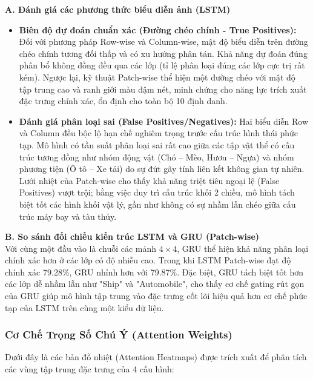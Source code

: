 \documentclass[12pt,a4paper]{article}
\numberwithin{figure}{section}
\numberwithin{table}{section}
\begin{document}
\textbf{A. Đánh giá các phương thức biểu diễn ảnh (LSTM)} \\
\begin{itemize}
    \item \textbf{Biên độ dự đoán chuẩn xác (Đường chéo chính - True Positives):} Đối với phương pháp Row-wise và Column-wise, mật độ biểu diễn trên đường chéo chính tương đối thấp và có xu hướng phân tán. Khả năng dự đoán đúng phân bổ không đồng đều qua các lớp (tỉ lệ phân loại đúng các lớp cực trị rất kém). Ngược lại, kỹ thuật Patch-wise thể hiện một đường chéo với mật độ tập trung cao và ranh giới màu đậm nét, minh chứng cho năng lực trích xuất đặc trưng chính xác, ổn định cho toàn bộ 10 định danh.
    \item \textbf{Đánh giá phân loại sai (False Positives/Negatives):} Hai biểu diễn Row và Column đều bộc lộ hạn chế nghiêm trọng trước cấu trúc hình thái phức tạp. Mô hình có tần suất phân loại sai rất cao giữa các tập vật thể có cấu trúc tương đồng như nhóm động vật (Chó -- Mèo, Hươu -- Ngựa) và nhóm phương tiện (Ô tô -- Xe tải) do sự đứt gãy tính liên kết không gian tự nhiên. Lưới nhiệt của Patch-wise cho thấy khả năng triệt tiêu ngoại lệ (False Positives) vượt trội; bằng việc duy trì cấu trúc khối 2 chiều, mô hình tách biệt tốt các hình khối vật lý, gần như không có sự nhầm lẫn chéo giữa cấu trúc máy bay và tàu thủy.
\end{itemize}

\textbf{B. So sánh đối chiếu kiến trúc LSTM và GRU (Patch-wise)} \\
Với cùng một đầu vào là chuỗi các mảnh $4 \times 4$, GRU thể hiện khả năng phân loại chính xác hơn ở các lớp có độ nhiễu cao. Trong khi LSTM Patch-wise đạt độ chính xác 79.28\%, GRU nhỉnh hơn với 79.87\%. Đặc biệt, GRU tách biệt tốt hơn các lớp dễ nhầm lẫn như "Ship" và "Automobile", cho thấy cơ chế gating rút gọn của GRU giúp mô hình tập trung vào đặc trưng cốt lõi hiệu quả hơn cơ chế phức tạp của LSTM trên cùng một kiểu dữ liệu.

\subsubsection{Cơ Chế Trọng Số Chú Ý (Attention Weights)}
Dưới đây là các bản đồ nhiệt (Attention Heatmaps) được trích xuất để phân tích các vùng tập trung đặc trưng của 4 cấu hình:
\end{document}
